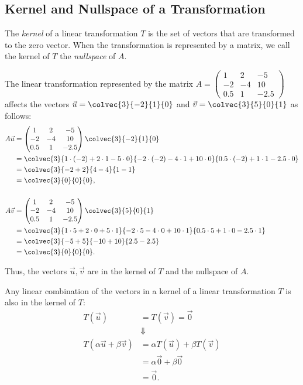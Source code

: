 \subsection{Kernel and Nullspace of a Transformation}
The \emph{kernel} of a linear transformation $T$ is the set of vectors that are transformed to the zero vector. When the transformation is represented by a matrix, we call the kernel of $T$ the \emph{nullspace} of $A$.
\begin{example}
  The linear transformation represented by the matrix $A=\begin{pmatrix} 1 & 2 & -5 \\ -2 & -4 & 10 \\ 0.5 & 1 & -2.5\end{pmatrix}$ affects the vectors $\vec{u}=\colvec{3}{-2}{1}{0}$ and $\vec{v}=\colvec{3}{5}{0}{1}$ as follows:
  \begin{align*}
	A\vec{u} &= \begin{pmatrix} 1 & 2 & -5 \\ -2 & -4 & 10 \\ 0.5 & 1 & -2.5 \end{pmatrix} \colvec{3}{-2}{1}{0}\\
	& = \colvec{3}{1\cdot(-2) + 2\cdot1 - 5\cdot0}{-2\cdot(-2) - 4\cdot1 + 10\cdot0}{0.5\cdot(-2) + 1\cdot1 -2.5\cdot0}\\
	&= \colvec{3}{-2+2}{4-4}{1-1}\\
	&= \colvec{3}{0}{0}{0},\\[5mm]
	A\vec{v} &= \begin{pmatrix} 1 & 2 & -5 \\ -2 & -4 & 10 \\ 0.5 & 1 & -2.5 \end{pmatrix} \colvec{3}{5}{0}{1}\\
	& = \colvec{3}{1\cdot5 + 2\cdot0 + 5\cdot1}{-2\cdot5 - 4\cdot0 + 10\cdot1}{0.5\cdot5 + 1\cdot0 -2.5\cdot1}\\
	&= \colvec{3}{-5+5}{-10+10}{2.5-2.5}\\
	&= \colvec{3}{0}{0}{0}.
  \end{align*}

  Thus, the vectors $\vec{u},\vec{v}$ are in the kernel of $T$ and the nullspace of $A$.
\end{example}

Any linear combination of the vectors in a kernel of a linear transformation $T$ is also in the kernel of $T$:
\begin{align*}
  T\left(\vec{u}\right) &= T\left( \vec{v} \right)=\vec{0}\\
  &\Downarrow\\
  T\left( \alpha\vec{u} + \beta\vec{v}\right) &= \alpha T\left( \vec{u} \right) + \beta T\left( \vec{v} \right)\\
  &= \alpha\vec{0} + \beta\vec{0}\\
  &= \vec{0}.
\end{align*}

